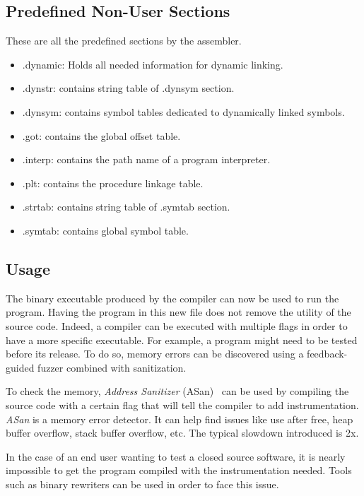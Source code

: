 \documentclass[a4paper,11pt,oneside]{report}
\begin{document}
\subsection{Predefined Non-User Sections}
These are all the predefined sections by the assembler.
\begin{itemize}
    \item    .dynamic: Holds all needed information for dynamic linking.
    \item    .dynstr: contains string table of .dynsym section.
    \item    .dynsym: contains symbol tables dedicated to dynamically linked
        symbols.
    \item    .got: contains the global offset table.
    \item    .interp: contains the path name of a program interpreter.
    \item    .plt: contains the procedure linkage table.
    \item    .strtab: contains string table of .symtab section.
    \item    .symtab: contains global symbol table.
\end{itemize}







\subsection{Usage}
The binary executable produced by the compiler can now be used to run the program.
Having the program in this new file does not remove the utility of the source code.
Indeed, a compiler can be executed with multiple flags in order to have a more 
specific executable. For example, a program might need to be tested before its
release. To do so, memory errors can be discovered using a feedback-guided fuzzer
combined with sanitization.


To check the memory, \textit{Address Sanitizer} (ASan)~\cite{ASan}
can be used by compiling the source code with a certain flag that will tell the
compiler to add instrumentation. 
\textit{ASan} is a memory error detector. It can help find issues like  use
after free, heap buffer overflow, stack buffer overflow, etc. The typical
slowdown introduced is 2x.


In the case of an end user wanting to test a closed source software, it is
nearly impossible to get the program compiled with the instrumentation needed.
Tools such as binary rewriters can be used in order to face this issue.
\end{document}
